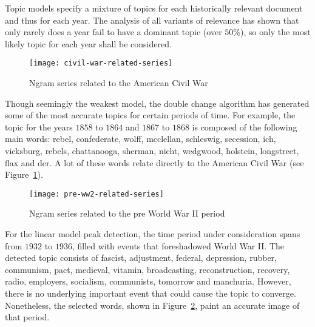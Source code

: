 
Topic models specify a mixture of topics for each historically relevant document and thus for each year. The analysis of all variants of relevance has shown that only rarely does a year fail to have a dominant topic (over $50 \%$), so only the most likely topic for each year shall be considered.

\begin{figure}[t]
\centering
\texttt{[image: civil-war-related-series]}
\caption{Ngram series related to the American Civil War}
\label{fig:civil-war-related-series}
\end{figure}

Though seemingly the weakest model, the double change algorithm has generated some of the most accurate topics for certain periods of time. For example, the topic for the years $1858$ to $1864$ and $1867$ to $1868$ is composed of the following main words: rebel, confederate, wolff, mcclellan, schleswig, secession, ich, vicksburg, rebels, chattanooga, sherman, nicht, wedgwood, holstein, longstreet, flax and der. A lot of these words relate directly to the American Civil War (see Figure~\ref{fig:civil-war-related-series}).

\begin{figure}[t]
\centering
\texttt{[image: pre-ww2-related-series]}
\caption{Ngram series related to the pre World War II period}
\label{fig:pre-ww2-related-series}
\end{figure}

For the linear model peak detection, the time period under consideration spans from $1932$ to $1936$, filled with events that foreshadowed World War II. The detected topic consists of fascist, adjustment, federal, depression, rubber, communism, pact, medieval, vitamin, broadcasting, reconstruction, recovery, radio, employers, socialism, communists, tomorrow and manchuria. However, there is no underlying important event that could cause the topic to converge. Nonetheless, the selected words, shown in Figure~\ref{fig:pre-ww2-related-series}, paint an accurate image of that period.

